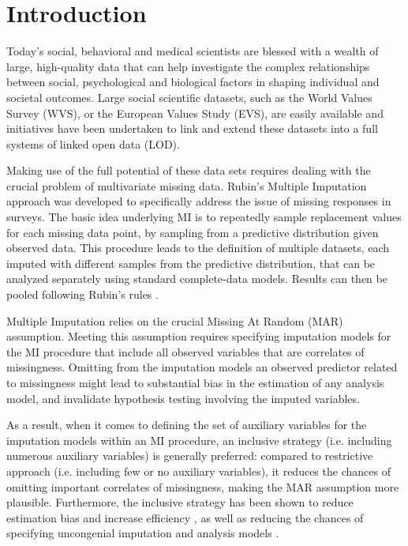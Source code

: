 \section{Introduction}


Today’s social, behavioral and medical scientists are blessed with a wealth of large, high-quality data that
can help investigate the complex relationships between social, psychological and biological factors in 
shaping individual and societal outcomes.
Large social scientific datasets, such as the World Values Survey (WVS), or the European Values Study (EVS), 
are easily available and initiatives have been undertaken to link and extend these datasets into a full systems 
of linked open data (LOD).

Making use of the full potential of these data sets requires dealing with the crucial problem of multivariate
missing data.
Rubin's Multiple Imputation approach \citep{rubin:1987} was developed to specifically address the issue of missing 
responses in surveys.
The basic idea underlying MI is to repeatedly sample replacement values for each missing data point, by sampling from a 
predictive distribution given observed data.
This procedure leads to the definition of multiple datasets, each imputed with different samples from the predictive
distribution, that can be analyzed separately using standard complete-data models.
Results can then be pooled following Rubin's rules \citep{rubin:1987}.

Multiple Imputation relies on the crucial Missing At Random (MAR) assumption.
Meeting this assumption requires specifying imputation models for the MI procedure that include all observed
variables that are correlates of missingness.
Omitting from the imputation models an observed predictor related to missingness might lead to substantial 
bias in the estimation of any analysis model, and invalidate hypothesis testing involving the imputed variables.

As a result, when it comes to defining the set of auxiliary variables for the imputation models within an MI procedure, 
an inclusive strategy (i.e. including numerous auxiliary variables) is generally preferred:
compared to restrictive approach (i.e. including few or no auxiliary variables), it reduces the chances of 
omitting important correlates of missingness, making the MAR assumption more plausible.
Furthermore, the inclusive strategy has been shown to reduce estimation bias and increase efficiency \citep{collinsEtAl:2001},
as well as reducing the chances of specifying uncongenial imputation and analysis models \citep{meng:1994}.


